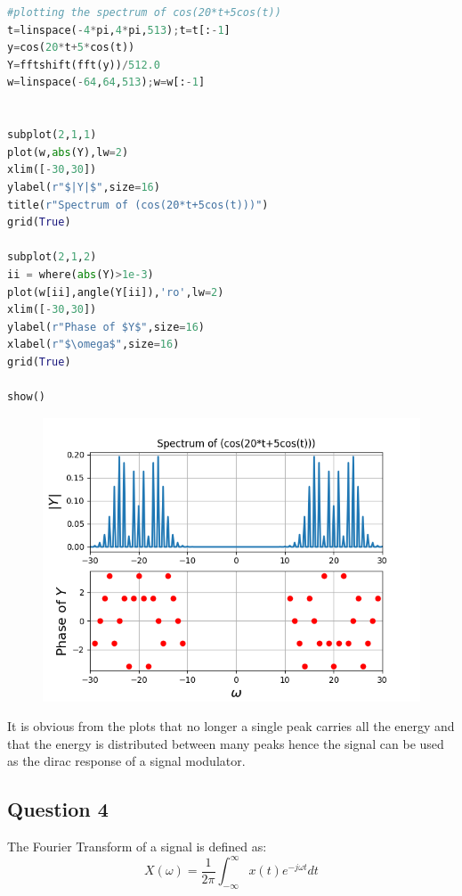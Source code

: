 \documentclass[11pt, a4paper]{article}
\begin{document}
\begin{lstlisting}[language = Python]
#plotting the spectrum of cos(20*t+5cos(t))
t=linspace(-4*pi,4*pi,513);t=t[:-1]
y=cos(20*t+5*cos(t))
Y=fftshift(fft(y))/512.0
w=linspace(-64,64,513);w=w[:-1]


subplot(2,1,1)
plot(w,abs(Y),lw=2)
xlim([-30,30])
ylabel(r"$|Y|$",size=16)
title(r"Spectrum of (cos(20*t+5cos(t)))")
grid(True)

subplot(2,1,2)
ii = where(abs(Y)>1e-3)
plot(w[ii],angle(Y[ii]),'ro',lw=2)
xlim([-30,30])
ylabel(r"Phase of $Y$",size=16)
xlabel(r"$\omega$",size=16)
grid(True)

show()
\end{lstlisting}

\begin{figure}[H]
    \centering
    \includegraphics[scale = 0.8]{Figure_7.png}
\end{figure}

It is obvious from the plots that no longer a single peak carries all the energy and that the energy is distributed between many peaks hence the signal can be used as the dirac response of a signal modulator.

\subsection{Question 4}
The Fourier Transform of a signal is defined as:
\begin{equation*}
    X(\omega) = \frac{1}{2\pi} \int_{-\infty}^{\infty} x(t) e^{-j\omega t} dt
\end{equation*}
\end{document}
